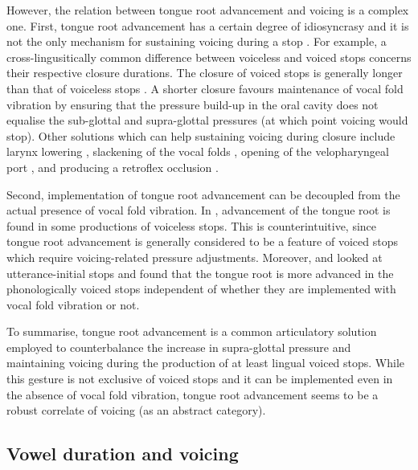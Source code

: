 \documentclass[12pt,]{article}
\begin{document}
However, the relation between tongue root advancement and voicing is a
complex one. First, tongue root advancement has a certain degree of
idiosyncrasy \citep{ahn2018} and it is not the only mechanism for
sustaining voicing during a stop
\citep{rothenberg1967, westbury1983, ohala2011}. For example, a
cross-lingusitically common difference between voiceless and voiced
stops concerns their respective closure durations. The closure of voiced
stops is generally longer than that of voiceless stops
\citep{lisker1957, umeda1977, van-summers1987, davis1989, de-jong1991}.
A shorter closure favours maintenance of vocal fold vibration by
ensuring that the pressure build-up in the oral cavity does not equalise
the sub-glottal and supra-glottal pressures (at which point voicing
would stop). Other solutions which can help sustaining voicing during
closure include larynx lowering \citep{riordan1980}, slackening of the
vocal folds \citet{halle1967}, opening of the velopharyngeal port
\citep{yanagihara1966}, and producing a retroflex occlusion
\citep{sprouse2008}.

Second, implementation of tongue root advancement can be decoupled from
the actual presence of vocal fold vibration. In \citet{westbury1983},
advancement of the tongue root is found in some productions of voiceless
stops. This is counterintuitive, since tongue root advancement is
generally considered to be a feature of voiced stops which require
voicing-related pressure adjustments. Moreover, \citet{ahn2015, ahn2018}
and \citet{ahn2016} looked at utterance-initial stops and found that the
tongue root is more advanced in the phonologically voiced stops
independent of whether they are implemented with vocal fold vibration or
not.

To summarise, tongue root advancement is a common articulatory solution
employed to counterbalance the increase in supra-glottal pressure and
maintaining voicing during the production of at least lingual voiced
stops. While this gesture is not exclusive of voiced stops and it can be
implemented even in the absence of vocal fold vibration, tongue root
advancement seems to be a robust correlate of voicing (as an abstract
category).

\hypertarget{vowel-duration-and-voicing}{%
\subsection{Vowel duration and
voicing}\label{vowel-duration-and-voicing}}
\end{document}
